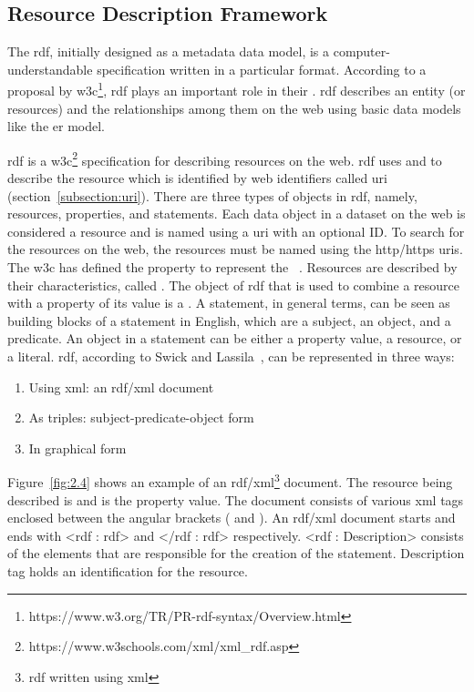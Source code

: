 \begin{doublespace}
\section{Resource Description Framework} \label{section:rdf}
\par The \ac{rdf}, initially designed as a metadata data model, is a computer-understandable specification written in a particular format. According to a proposal by \ac{w3c}\footnote{https://www.w3.org/TR/PR-rdf-syntax/Overview.html}, \ac{rdf} plays an important role in their . \ac{rdf} describes an entity (or resources) and the relationships among them on the web using basic data models like the \ac{er} model.
\par \ac{rdf} is a \ac{w3c}\footnote{https://www.w3schools.com/xml/xml\_rdf.asp} specification for describing resources on the web. \ac{rdf} uses  and  to describe the resource which is identified by web identifiers called \ac{uri} (section~\ref{subsection:uri}). There are three types of objects in \ac{rdf}, namely, resources, properties, and statements. Each data object in a dataset on the web is considered a resource and is named using a \ac{uri} with an optional ID. To search for the resources on the web, the resources must be named using the \ac{http}/\ac{https} \ac{uri}s. The \ac{w3c} has defined the  property to represent the ~\cite{cyganiak2014rdf}. Resources are described by their characteristics, called . The object of \ac{rdf} that is used to combine a resource with a property of its value is a . A statement, in general terms, can be seen as building blocks of a statement in English, which are a subject, an object, and a predicate. An object in a statement can be either a property value, a resource, or a literal. \ac{rdf}, according to Swick and Lassila~\cite{beckett2004rdf}, can be represented in three ways:
\begin{enumerate}
  \item Using \ac{xml}: an \ac{rdf}/\ac{xml} document
  \item As triples: subject-predicate-object form
  \item In graphical form
\end{enumerate}
\par Figure~\ref{fig:2.4} shows an example of an \ac{rdf}/\ac{xml}\footnote{\ac{rdf} written using \ac{xml}} document. The resource being described is  and  is the property value. The document consists of various \ac{xml} tags enclosed between the angular brackets (\say{<} and \say{>}). An \ac{rdf}/\ac{xml} document starts and ends with <rdf : \ac{rdf}> and </rdf : \ac{rdf}> respectively. <rdf : Description> consists of the elements that are responsible for the creation of the statement. Description tag holds an identification for the resource.

\end{doublespace}
